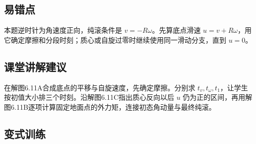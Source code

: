 \documentclass[UTF8,fontset=fandol,a4paper,11pt]{ctexart}
\begin{document}

\subsection*{易错点}

本题逆时针为角速度正向，纯滚条件是 $v=-R\omega$。先算底点滑速 $u=v+R\omega$，用它确定摩擦和分段时刻；质心或自旋过零时继续使用同一滑动分支，直到 $u=0$。



\subsection*{课堂讲解建议}

在解图6.11A合成底点的平移与自旋速度，先确定摩擦。分别求 $t_v,t_\omega,t_1$，让学生按初值大小排三个时刻。沿解图6.11C指出质心反向以后 $u$ 仍为正的区间，再用解图6.11B逐项计算固定地面点的外力矩，连接初态角动量与最终纯滚。




\subsection*{变式训练}
\end{document}
